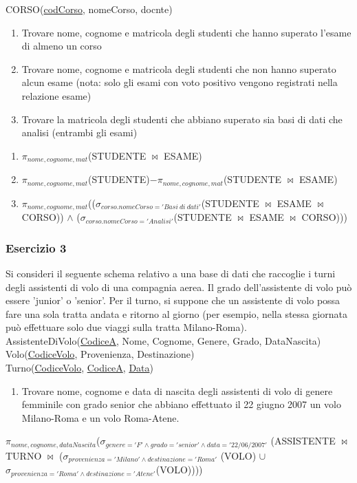 \documentclass[a4paper]{article}
\begin{document}
CORSO(\underline{codCorso}, nomeCorso, docnte)\par \begin{enumerate}
  \item Trovare nome, cognome e matricola degli studenti che hanno superato l'esame di almeno un corso
  \item Trovare nome, cognome e matricola degli studenti che non hanno superato alcun esame (nota: solo gli esami con voto positivo vengono registrati nella relazione esame)
  \item Trovare la matricola degli studenti che abbiano superato sia basi di dati che analisi (entrambi gli esami)
\end{enumerate}\par \begin{mybox}{}
\begin{enumerate}
  \item $\pi_{nome, cognome, mat}$(STUDENTE $\Join$ ESAME)
  \item $\pi_{nome, cognome, mat}$(STUDENTE)$- \pi_{nome, cognome, mat}$(STUDENTE $\Join$ ESAME)
  \item $\pi_{nome, cognome, mat}$(($\sigma_{corso.nomeCorso='Basi\ di\ dati'}$(STUDENTE $\Join$ ESAME $\Join$ CORSO)) $\land$ ($\sigma_{corso.nomeCorso='Analisi'}$(STUDENTE $\Join$ ESAME $\Join$ CORSO)))
\end{enumerate}
\end{mybox}\par \subsubsection{Esercizio 3}
Si consideri il seguente schema  relativo a una base di dati che raccoglie i turni degli assistenti di volo di una compagnia aerea. Il grado dell'assistente di volo può essere 'junior' o 'senior'. Per il turno, si suppone che un assistente di volo possa fare una sola tratta andata e ritorno al giorno (per esempio, nella stessa giornata può effettuare solo due viaggi sulla tratta Milano-Roma).\medskip\\
AssistenteDiVolo(\underline{CodiceA}, Nome, Cognome, Genere, Grado, DataNascita)\\
Volo(\underline{CodiceVolo}, Provenienza, Destinazione)\\
Turno(\underline{CodiceVolo}, \underline{CodiceA}, \underline{Data})\par \begin{enumerate}
  \item Trovare nome, cognome e data di nascita degli assistenti di volo di genere femminile con grado senior che abbiano effettuato il 22 giugno 2007 un volo Milano-Roma e un volo Roma-Atene.
\end{enumerate}\par \begin{mybox}{}
$\pi_{nome, cognome, dataNascita}$($\sigma_{genere='F' \land grado='senior' \land data='22/06/2007'}$ (ASSISTENTE $\Join$ TURNO $\Join$ ($\sigma_{provenienza='Milano' \land destinazione='Roma'}$ (VOLO) $\cup$ $\sigma_{provenienza='Roma' \land destinazione='Atene'}$(VOLO))))
\end{mybox}\par 
\end{document}
